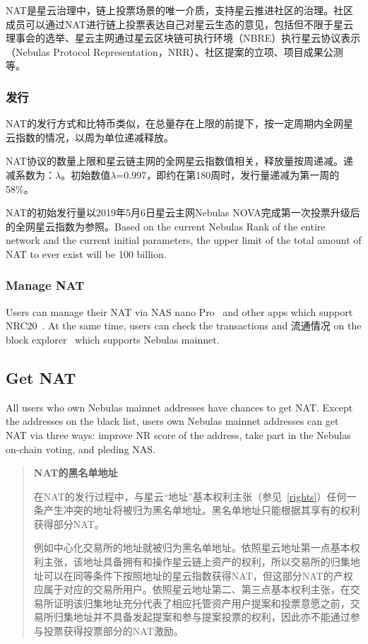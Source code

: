 NAT是星云治理中，链上投票场景的唯一介质，支持星云推进社区的治理。社区成员可以通过NAT进行链上投票表达自己对星云生态的意见，包括但不限于星云理事会的选举、星云主网通过星云区块链可执行环境（NBRE）执行星云协议表示（Nebulas Protocol Representation，NRR）、社区提案的立项、项目成果公测等。

\subsubsection{发行}
	
NAT的发行方式和比特币类似，在总量存在上限的前提下，按一定周期内全网星云指数的情况，以周为单位递减释放。

NAT协议的数量上限和星云链主网的全网星云指数值相关，释放量按周递减。递减系数为：$\lambda$。初始数值$\lambda$=0.997，即约在第180周时，发行量递减为第一周的58\%。

NAT的初始发行量以2019年5月6日星云主网Nebulas NOVA完成第一次投票升级后的全网星云指数为参照。Based on the current Nebulas Rank of the entire network and the current initial parameters, the upper limit of the total amount of NAT to ever exist will be 100 billion.

\subsubsection{Manage NAT}

Users can manage their NAT via NAS nano Pro~\cite{NASnano} and other apps which support NRC20~\cite{wallets}. At the same time, users can check the transactions and 流通情况 on the block explorer~\cite{explorer} which supports Nebulas mainnet.

\subsection{Get NAT}

All users who own Nebulas mainnet addresses have chances to get NAT. Except the addresses on the black list, users own Nebulas mainnet addresses can get NAT via three ways: improve NR score of the address, take part in the Nebulas on-chain voting, and pleding NAS.

\begin{quotation}

\textbf{NAT的黑名单地址}

在NAT的发行过程中，与星云“地址”基本权利主张（参见~\ref{rights}）任何一条产生冲突的地址将被归为黑名单地址。黑名单地址只能根据其享有的权利获得部分NAT。

例如中心化交易所的地址就被归为黑名单地址。依照星云地址第一点基本权利主张，该地址具备拥有和操作星云链上资产的权利，所以交易所的归集地址可以在同等条件下按照地址的星云指数获得NAT，但这部分NAT的产权应属于对应的交易所用户。依照星云地址第二、第三点基本权利主张，在交易所证明该归集地址充分代表了相应托管资产用户提案和投票意愿之前，交易所归集地址并不具备发起提案和参与提案投票的权利，因此亦不能通过参与投票获得投票部分的NAT激励。

\end{quotation}

